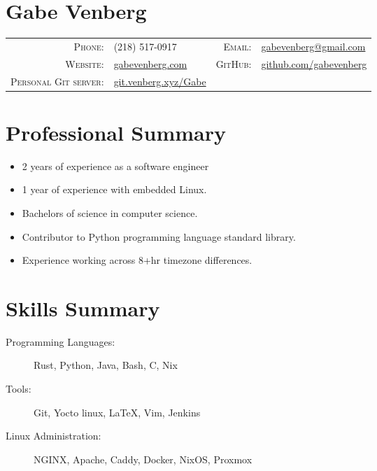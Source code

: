 \documentclass[letterpaper,10pt]{article}
\begin{document}
\pagestyle{empty}%
\section*{Gabe Venberg}
    \begin{tabular}{r l r l}
    \textsc{Phone:} & (218) 517-0917 &
    \textsc{Email:} & \href{mailto:gabevenberg@gmail.com}{gabevenberg@gmail.com}\\
    \textsc{Website:} & \href{https://gabevenberg.com}{gabevenberg.com} &
    \textsc{GitHub:} & \href{https://github.com/gabevenberg}{github.com/gabevenberg}\\
    \textsc{Personal Git server:} & \href{https://git.venberg.xyz/Gabe}{git.venberg.xyz/Gabe} &
    \end{tabular}
\section*{Professional Summary}

\begin{itemize}
    \item 2 years of experience as a software engineer
    \item 1 year of experience with embedded Linux.
    \item Bachelors of science in computer science.
    \item Contributor to Python programming language standard library.
    \item Experience working across 8+hr timezone differences.
\end{itemize}

\section*{Skills Summary}

\begin{description}
    \item[Programming Languages:] Rust, Python, Java, Bash, C, Nix
    \item[Tools:] Git, Yocto linux, \LaTeX{}, Vim, Jenkins
    \item[Linux Administration:] NGINX, Apache, Caddy, Docker, NixOS, Proxmox
\end{description}
\end{document}
